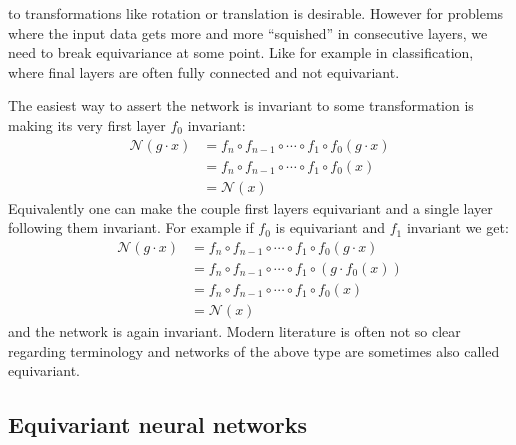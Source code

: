         to transformations like rotation or translation is desirable.
        However for problems where the input data gets more and more ``squished'' in consecutive layers,
        we need to break equivariance at some point. Like for example in classification,
        where final layers are often fully connected and not equivariant. \par
        The easiest way to assert the network is invariant to some transformation
        is making its very first layer $f_0$ invariant:
        \begin{align*}
            \mathcal{N}(g\cdot x)
            &= f_n \circ f_{n-1} \circ \cdots \circ f_1 \circ f_0(g\cdot x)  \\
            &= f_n \circ f_{n-1} \circ \cdots \circ f_1 \circ f_0(x) \\
            &= \mathcal{N}(x)
        \end{align*}
        Equivalently \cite{lie_transformer}
        one can make the couple first layers equivariant and a single layer
        following them invariant. For example if $f_0$ is equivariant and $f_1$ invariant we get:
        \begin{align*}
            \mathcal{N}(g\cdot x)
            &= f_n \circ f_{n-1} \circ \cdots \circ f_1 \circ f_0(g\cdot x)  \\
            &= f_n \circ f_{n-1} \circ \cdots \circ f_1 \circ \left( g \cdot f_0(x) \right) \\
            &= f_n \circ f_{n-1} \circ \cdots \circ f_1 \circ f_0(x) \\
            &= \mathcal{N}(x)
        \end{align*}
        and the network is again invariant. Modern literature is often not so
        clear regarding terminology and networks of the above type are sometimes
        also called equivariant.

\subsection{Equivariant neural networks}
